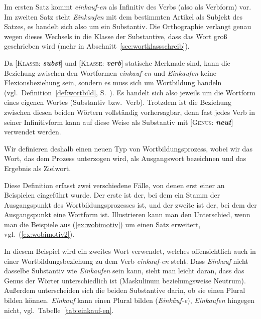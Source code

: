 Im ersten Satz kommt \textit{einkauf-en} als Infinitiv des Verbs (also als Verbform) vor.
Im zweiten Satz steht \textit{Einkaufen} mit dem bestimmten Artikel als Subjekt des Satzes, es handelt sich also um ein Substantiv.
Die Orthographie verlangt genau wegen dieses Wechsels in die Klasse der Substantive, dass das Wort groß geschrieben wird (mehr in Abschnitt~\ref{sec:wortklassschreib}).

Da [\textsc{Klasse}: \textit{\textbf{subst}}] und [\textsc{Klasse}: \textit{\textbf{verb}}] statische Merkmale sind, kann die Beziehung zwischen den Wortformen \textit{einkauf-en} und \textit{Einkaufen} keine Flexionsbeziehung sein, sondern es muss sich um Wortbildung handeln (vgl.\ Definition~\ref{def:wortbild}, S.~\pageref{def:wortbild}).
Es handelt sich also jeweils um die Wortform eines eigenen Wortes (Substantiv bzw.\ Verb).
Trotzdem ist die Beziehung zwischen diesen beiden Wörtern vollständig vorhersagbar, denn fast jedes Verb in seiner Infinitivform kann auf diese Weise als Substantiv mit [\textsc{Genus}: \textit{\textbf{neut}}] verwendet werden.

Wir definieren deshalb einen neuen Typ von Wortbildungsprozess, wobei wir das Wort, das dem Prozess unterzogen wird, als Ausgangswort bezeichnen und das Ergebnis als Zielwort.


Diese Definition erfasst zwei verschiedene Fälle, von denen erst einer an Beispielen eingeführt wurde.
Der erste ist der, bei dem ein Stamm der Ausgangspunkt des Wortbildungsprozesses ist, und der zweite ist der, bei dem der Ausgangspunkt eine Wortform ist.
Illustrieren kann man den Unterschied, wenn man die Beispiele aus (\ref{ex:wobimotiv}) um einen Satz erweitert, vgl.\ (\ref{ex:wobimotiv2}).

\begin{exe}
\end{exe}

In diesem Beispiel wird ein zweites Wort verwendet, welches offensichtlich auch in einer Wortbildungsbeziehung zu dem Verb \textit{einkauf-en} steht.
Dass \textit{Einkauf} nicht dasselbe Substantiv wie \textit{Einkaufen} sein kann, sieht man leicht daran, dass das Genus der Wörter unterschiedlich ist (Maskulinum beziehungsweise Neutrum).
Außerdem unterscheiden sich die beiden Substantive darin, ob sie einen Plural bilden können.
\textit{Einkauf} kann einen Plural bilden (\textit{Einkäuf-e}), \textit{Einkaufen} hingegen nicht, vgl.\ Tabelle~\ref{tab:einkauf-en}.

